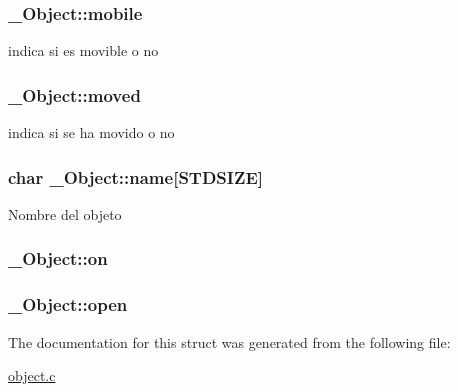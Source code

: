 \subsubsection[{\texorpdfstring{mobile}{mobile}}]{ \+\_\+\+Object\+::mobile}\hypertarget{struct__Object_a95dd9ff00e5d341b5be3bc3a5bf1ee9a}{}\label{struct__Object_a95dd9ff00e5d341b5be3bc3a5bf1ee9a}
indica si es movible o no 
\subsubsection[{\texorpdfstring{moved}{moved}}]{ \+\_\+\+Object\+::moved}\hypertarget{struct__Object_a584096c8e43f53884aa7216505cc0e89}{}\label{struct__Object_a584096c8e43f53884aa7216505cc0e89}
indica si se ha movido o no 
\subsubsection[{\texorpdfstring{name}{name}}]{\setlength{\rightskip}{0pt plus 5cm}char \+\_\+\+Object\+::name\mbox{[}{\bf S\+T\+D\+S\+I\+ZE}\mbox{]}}\hypertarget{struct__Object_a5f13167436f75d12f48d3f152ce91d0a}{}\label{struct__Object_a5f13167436f75d12f48d3f152ce91d0a}
Nombre del objeto 
\subsubsection[{\texorpdfstring{on}{on}}]{ \+\_\+\+Object\+::on}\hypertarget{struct__Object_a325dedec5324e588d2a86e7ffa478350}{}\label{struct__Object_a325dedec5324e588d2a86e7ffa478350}
\subsubsection[{\texorpdfstring{open}{open}}]{ \+\_\+\+Object\+::open}\hypertarget{struct__Object_a0922dd9891e6aa617ce1d51ae27c0175}{}\label{struct__Object_a0922dd9891e6aa617ce1d51ae27c0175}


The documentation for this struct was generated from the following file\+:\begin{DoxyCompactItemize}
\item 
\hyperlink{object_8c}{object.\+c}\end{DoxyCompactItemize}
